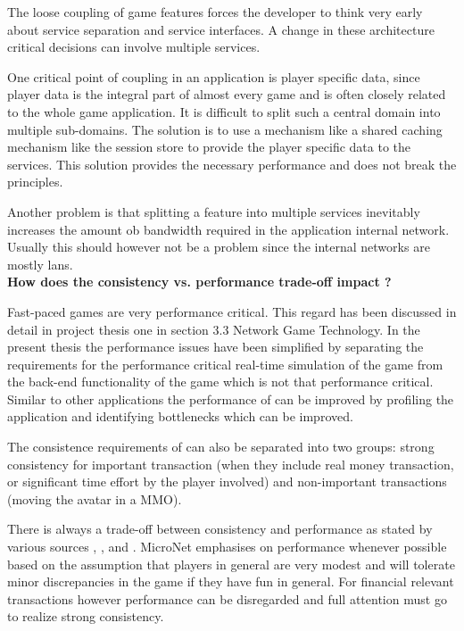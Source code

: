 The loose coupling of game features forces the developer to think very early
about service separation and service interfaces. A change in these architecture
critical decisions can involve multiple services.

One critical point of coupling in an \og{} application is player specific data,
since player data is the integral part of almost every game and is often closely
related to the whole game application. It is difficult to split such a central
domain into multiple sub-domains. The solution is to use a mechanism like a
shared caching mechanism like the session store to provide the player specific
data to the services. This solution provides the necessary performance and does
not break the \ms{} principles.

Another problem is that splitting a feature into multiple services inevitably
increases the amount ob bandwidth required in the application internal network.
Usually this should however not be a problem since the internal networks are
mostly \glspl{lan}.\\

\noindent
\textbf{How does the consistency vs. performance trade-off impact \ogs{}?}

Fast-paced games are very performance critical. This regard has been discussed
in detail in project thesis one \cite{biedermann2015project1} in section 3.3
Network Game Technology. In the present thesis the performance issues have been
simplified by separating the requirements for the performance critical real-time
simulation of the game from the back-end functionality of the game which is not
that performance critical. Similar to other applications the performance of
\ogs{} can be improved by profiling the application and identifying bottlenecks
which can be improved.

The consistence requirements of \ogs{} can also be separated into two groups:
strong consistency for important transaction (when they include real money
transaction, or significant time effort by the player involved) and
non-important transactions (moving the avatar in a MMO).

There is always a trade-off between consistency and performance as stated by
various sources \cite{wada2011data}, \cite{olston2000offering}, and
\cite{franklin1997transactional}. MicroNet emphasises on performance whenever
possible based on the assumption that players in general are very modest and
will tolerate minor discrepancies in the game if they have fun in general. For
financial relevant transactions however performance can be disregarded and full
attention must go to realize strong consistency.\\

